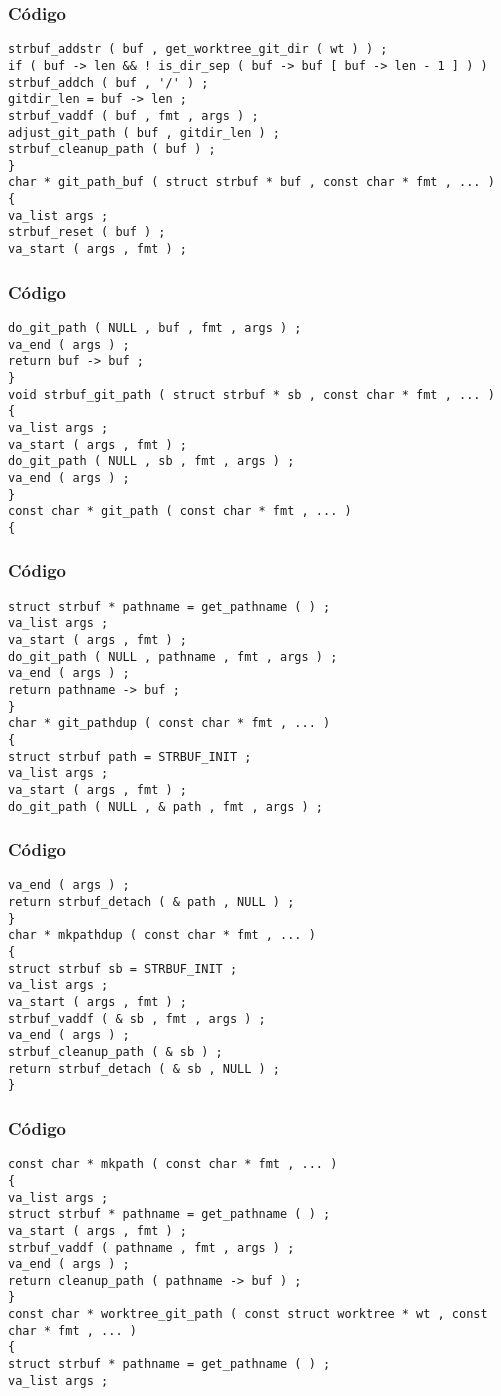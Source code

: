 \documentclass{beamer}
\begin{document}
\begin{frame}[fragile]
\frametitle{C\'odigo}
\begin{verbatim}
strbuf_addstr ( buf , get_worktree_git_dir ( wt ) ) ; 
if ( buf -> len && ! is_dir_sep ( buf -> buf [ buf -> len - 1 ] ) ) 
strbuf_addch ( buf , '/' ) ; 
gitdir_len = buf -> len ; 
strbuf_vaddf ( buf , fmt , args ) ; 
adjust_git_path ( buf , gitdir_len ) ; 
strbuf_cleanup_path ( buf ) ; 
} 
char * git_path_buf ( struct strbuf * buf , const char * fmt , ... ) 
{ 
va_list args ; 
strbuf_reset ( buf ) ; 
va_start ( args , fmt ) ; 
\end{verbatim}
\end{frame}
\begin{frame}[fragile]
\frametitle{C\'odigo}
\begin{verbatim}
do_git_path ( NULL , buf , fmt , args ) ; 
va_end ( args ) ; 
return buf -> buf ; 
} 
void strbuf_git_path ( struct strbuf * sb , const char * fmt , ... ) 
{ 
va_list args ; 
va_start ( args , fmt ) ; 
do_git_path ( NULL , sb , fmt , args ) ; 
va_end ( args ) ; 
} 
const char * git_path ( const char * fmt , ... ) 
{ 
\end{verbatim}
\end{frame}
\begin{frame}[fragile]
\frametitle{C\'odigo}
\begin{verbatim}
struct strbuf * pathname = get_pathname ( ) ; 
va_list args ; 
va_start ( args , fmt ) ; 
do_git_path ( NULL , pathname , fmt , args ) ; 
va_end ( args ) ; 
return pathname -> buf ; 
} 
char * git_pathdup ( const char * fmt , ... ) 
{ 
struct strbuf path = STRBUF_INIT ; 
va_list args ; 
va_start ( args , fmt ) ; 
do_git_path ( NULL , & path , fmt , args ) ; 
\end{verbatim}
\end{frame}
\begin{frame}[fragile]
\frametitle{C\'odigo}
\begin{verbatim}
va_end ( args ) ; 
return strbuf_detach ( & path , NULL ) ; 
} 
char * mkpathdup ( const char * fmt , ... ) 
{ 
struct strbuf sb = STRBUF_INIT ; 
va_list args ; 
va_start ( args , fmt ) ; 
strbuf_vaddf ( & sb , fmt , args ) ; 
va_end ( args ) ; 
strbuf_cleanup_path ( & sb ) ; 
return strbuf_detach ( & sb , NULL ) ; 
} 
\end{verbatim}
\end{frame}
\begin{frame}[fragile]
\frametitle{C\'odigo}
\begin{verbatim}
const char * mkpath ( const char * fmt , ... ) 
{ 
va_list args ; 
struct strbuf * pathname = get_pathname ( ) ; 
va_start ( args , fmt ) ; 
strbuf_vaddf ( pathname , fmt , args ) ; 
va_end ( args ) ; 
return cleanup_path ( pathname -> buf ) ; 
} 
const char * worktree_git_path ( const struct worktree * wt , const char * fmt , ... ) 
{ 
struct strbuf * pathname = get_pathname ( ) ; 
va_list args ; 
\end{verbatim}
\end{frame}
\end{document}
